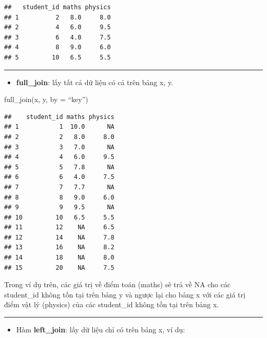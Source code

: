 \documentclass[]{krantz}
\makeatletter
\newenvironment{Shaded}{\begin{snugshade}}{\end{snugshade}}
\newcommand{\DataTypeTok}[1]{\textcolor[rgb]{0.27,0.27,0.27}{#1}}
\newcommand{\KeywordTok}[1]{\textcolor[rgb]{0.27,0.27,0.27}{\textbf{#1}}}
\newcommand{\NormalTok}[1]{#1}
\newcommand{\OperatorTok}[1]{\textcolor[rgb]{0.43,0.43,0.43}{\textbf{#1}}}
\newcommand{\StringTok}[1]{\textcolor[rgb]{0.5,0.5,0.5}{#1}}
\providecommand{\tightlist}{%
  \setlength{\itemsep}{0pt}\setlength{\parskip}{0pt}}
\renewenvironment{quote}{\begin{VF}}{\end{VF}}
\newenvironment{kframe}{%
\medskip{}
\setlength{\fboxsep}{.8em}
 \def\at@end@of@kframe{}%
 \ifinner\ifhmode%
  \def\at@end@of@kframe{\end{minipage}}%
  \begin{minipage}{\columnwidth}%
 \fi\fi%
 \def\FrameCommand##1{\hskip\@totalleftmargin \hskip-\fboxsep
 \colorbox{shadecolor}{##1}\hskip-\fboxsep
     \hskip-\linewidth \hskip-\@totalleftmargin \hskip\columnwidth}%
 \MakeFramed {\advance\hsize-\width
   \@totalleftmargin\z@ \linewidth\hsize
   \@setminipage}}%
 {\par\unskip\endMakeFramed%
 \at@end@of@kframe}
\renewenvironment{Shaded}{\begin{kframe}}{\end{kframe}}
\renewenvironment{Shaded}{\begin{snugshade}}{\end{snugshade}}
\renewcommand{\DataTypeTok}[1]{\textcolor[rgb]{0.13,0.29,0.53}{#1}}
\renewcommand{\KeywordTok}[1]{\textcolor[rgb]{0.13,0.29,0.53}{\textbf{#1}}}
\renewcommand{\NormalTok}[1]{#1}
\renewcommand{\OperatorTok}[1]{\textcolor[rgb]{0.81,0.36,0.00}{\textbf{#1}}}
\renewcommand{\StringTok}[1]{\textcolor[rgb]{0.31,0.60,0.02}{#1}}
\theoremstyle{definition}
\theoremstyle{definition}
\theoremstyle{definition}
\theoremstyle{remark}
\makeatother
\begin{document}
\begin{verbatim}
##   student_id maths physics
## 1          2   8.0     8.0
## 2          4   6.0     9.5
## 3          6   4.0     7.5
## 4          8   9.0     6.0
## 5         10   6.5     5.5
\end{verbatim}

\begin{center}\rule{0.5\linewidth}{\linethickness}\end{center}

\begin{itemize}
\tightlist
\item
  \textbf{full\_join}: lấy tất cả dữ liệu có cả trên bảng x, y.
\end{itemize}

\begin{quote}
full\_join(x, y, by = ``key'')
\end{quote}

\begin{Shaded}
\end{Shaded}

\begin{verbatim}
##    student_id maths physics
## 1           1  10.0      NA
## 2           2   8.0     8.0
## 3           3   7.0      NA
## 4           4   6.0     9.5
## 5           5   7.8      NA
## 6           6   4.0     7.5
## 7           7   7.7      NA
## 8           8   9.0     6.0
## 9           9   9.5      NA
## 10         10   6.5     5.5
## 11         12    NA     6.5
## 12         14    NA     7.8
## 13         16    NA     8.2
## 14         18    NA     8.0
## 15         20    NA     7.5
\end{verbatim}

Trong ví dụ trên, các giá trị về điểm toán (maths) sẽ trả về NA cho các
student\_id không tồn tại trên bảng y và ngược lại cho bảng x với các
giá trị điểm vật lý (physics) của các student\_id không tồn tại trên
bảng x.

\begin{center}\rule{0.5\linewidth}{\linethickness}\end{center}

\begin{itemize}
\tightlist
\item
  Hàm \textbf{left\_join}: lấy dữ liệu chỉ có trên bảng x, ví dụ:
\end{itemize}
\end{document}
